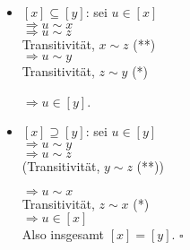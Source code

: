 \documentclass[a4paper, 12pt, twoside] {article}
\begin{document}
\begin{itemize}
\item $[x] \subseteq [y]$: sei $u \in [x]$ \\
$\Rightarrow u \sim x$ \\
$\Rightarrow u \sim z$ \\
Transitivität, $x \sim z$ (**) \\
$\Rightarrow u \sim y$ \\
Transitivität, $z \sim y$ (*)

$\Rightarrow u \in [y]$.

\item $[x] \supseteq [y]$: sei $u \in [y]$ \\
$\Rightarrow u \sim y$ \\
$\Rightarrow u \sim z$ \\
(Transitivität, $y \sim z$ (**))

$\Rightarrow u \sim x$ \\
Transitivität, $z \sim x$ (*) \\
$\Rightarrow u \in [x]$ \\
Also insgesamt $[x] = [y]$. \hfill $\square$

\end{itemize}
\end{document}
